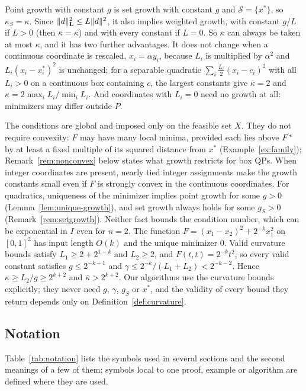 Point growth with constant $g$ is set growth with constant $g$ and
$\mathcal S=\{x^*\}$, so $\kappa_S=\kappa$. Since $\lVert d\rVert_{\mathbf L}^2\le
L\lVert d\rVert^2$, it also implies weighted growth, with constant $g/L$ if $L>0$
(then $\bar\kappa=\kappa$) and with every constant if $L=0$. So $\bar\kappa$
can always be taken at most $\kappa$, and it has two further advantages. It
does not change when a continuous coordinate is rescaled, $x_i=\alpha y_i$,
because $L_i$ is multiplied by $\alpha^2$ and $L_i(x_i-x_i^*)^2$ is
unchanged; for a separable quadratic $\sum_i\frac{L_i}{2}(x_i-c_i)^2$ with
all $L_i>0$ on a continuous box containing $c$, the largest constants give
$\bar\kappa=2$ and $\kappa=2\max_iL_i/\min_iL_i$. And coordinates with
$L_i=0$ need no growth at all: minimizers may differ outside $P$.

The conditions are global and imposed only on the feasible set $X$. They do
not require convexity: $F$ may have many local minima, provided each lies above
$F^{*}$ by at least a fixed multiple of its squared distance from $x^*$
(Example~\ref{ex:family}); Remark~\ref{rem:nonconvex} below states what
growth restricts for box QPs. When integer coordinates are present,
nearly tied integer assignments make the growth constants small even if $F$ is
strongly convex in the continuous coordinates. For quadratics, uniqueness of
the minimizer implies point growth for some $g>0$
(Lemma~\ref{lem:unique-growth}), and set growth always holds for some $g_S>0$
(Remark~\ref{rem:setgrowth}). Neither fact bounds the condition number, which
can be exponential in $I$ even for $n=2$. The function
$F=(x_1-x_2)^2+2^{-k}x_1^2$ on $[0,1]^2$ has input length $O(k)$ and the
unique minimizer $0$. Valid curvature bounds satisfy $L_1\ge2+2^{1-k}$ and
$L_2\ge2$, and $F(t,t)=2^{-k}t^2$, so every valid constant satisfies
$g\le2^{-k-1}$ and $\gamma\le2^{-k}/(L_1+L_2)<2^{-k-2}$. Hence
$\kappa\ge L_2/g\ge2^{k+2}$ and $\bar\kappa>2^{k+2}$. Our
algorithms use the curvature bounds explicitly; they never need $g$, $\gamma$,
$g_S$ or $x^*$, and the validity of every bound they return depends only on
Definition~\ref{def:curvature}.


\subsection{Notation}
Table~\ref{tab:notation} lists the symbols used in several sections and the
second meanings of a few of them; symbols local to one proof, example or
algorithm are defined where they are used.

